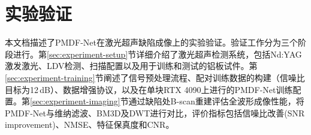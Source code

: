 \section{实验验证}
\label{sec:experiments}

本文档描述了PMDF-Net在激光超声缺陷成像上的实验验证。验证工作分为三个阶段进行。第\ref{sec:experiment-setup}节详细介绍了激光超声检测系统，包括Nd:YAG激发激光、LDV检测、扫描配置以及用于训练和测试的铝板试件。第\ref{sec:experiment-training}节阐述了信号预处理流程、配对训练数据的构建（信噪比目标为12\,dB）、数据增强协议，以及在单块RTX 4090上进行的PMDF-Net训练配置。第\ref{sec:experiment-imaging}节通过缺陷处B-scan重建评估全波形成像性能，将PMDF-Net与维纳滤波、BM3D及DWT进行对比，评价指标包括信噪比改善(SNR improvement)、NMSE、特征保真度和CNR。











